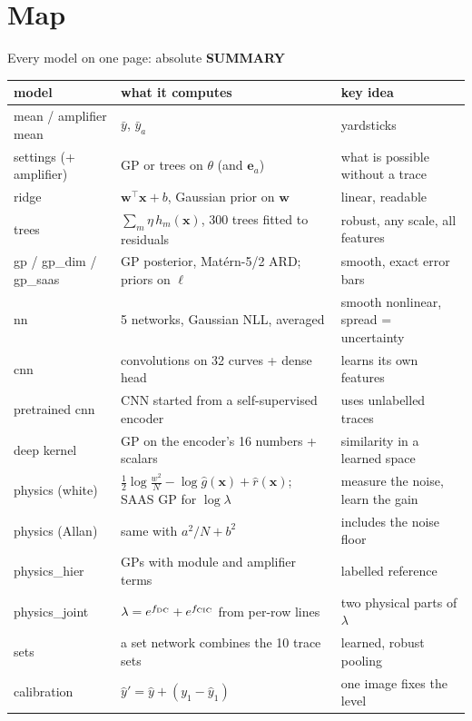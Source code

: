 \documentclass[aspectratio=169,11pt]{beamer}
\newcommand{\eyebrow}[2][trace]{{\color{#1}\scriptsize\bfseries\MakeUppercase{#2}}\par\vspace{0.1em}}
\newcommand{\xo}{\mathbf{x}}
\newcommand{\T}{^{\!\top}}
\begin{document}
\section{Map}
\begin{frame}{Every model on one page: absolute}
\eyebrow{Summary}
\centering\scriptsize\renewcommand{\arraystretch}{1.0}
\begin{tabular}{@{}p{2.9cm}p{6.6cm}p{4.4cm}@{}}\toprule
model & what it computes & key idea\\\midrule
mean / amplifier mean & $\bar y$, $\bar y_a$ & yardsticks\\
settings (+ amplifier) & GP or trees on $\theta$ (and $\mathbf e_a$) & what is possible without a trace\\
ridge & $\mathbf w\T\xo+b$, Gaussian prior on $\mathbf w$ & linear, readable\\
trees & $\sum_m\eta\,h_m(\xo)$, 300 trees fitted to residuals & robust, any scale, all features\\
gp / gp\_dim / gp\_saas & GP posterior, Matérn-5/2 ARD; priors on $\ell$ & smooth, exact error bars\\
nn & 5 networks, Gaussian NLL, averaged & smooth nonlinear, spread = uncertainty\\
cnn & convolutions on 32 curves + dense head & learns its own features\\
pretrained cnn & CNN started from a self-supervised encoder & uses unlabelled traces\\
deep kernel & GP on the encoder's 16 numbers + scalars & similarity in a learned space\\\midrule
physics (white) & $\tfrac12\log\frac{w^2}{N}-\log\hat g(\xo)+\hat r(\xo)$; SAAS GP for $\log\lambda$ & measure the noise, learn the gain\\
physics (Allan) & same with $a^2/N+b^2$ & includes the noise floor\\
physics\_hier & GPs with module and amplifier terms & labelled reference\\
physics\_joint & $\lambda=e^{f_{\rm DC}}+e^{f_{\rm CIC}}$ from per-row lines & two physical parts of $\lambda$\\
sets & a set network combines the 10 trace sets & learned, robust pooling\\
calibration & $\hat y'=\hat y+(y_1-\hat y_1)$ & one image fixes the level\\\bottomrule
\end{tabular}
\end{frame}
\end{document}
